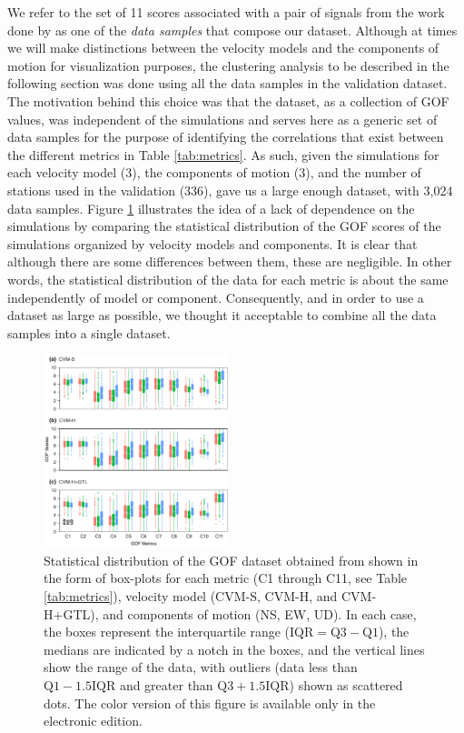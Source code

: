We refer to the set of 11 scores associated with a pair of signals from the work done by \citet{Taborda_2014_BSSA} as one of the \textit{data samples} that compose our dataset. Although at times we will make distinctions between the velocity models and the components of motion for visualization purposes, the clustering analysis to be described in the following section was done using all the data samples in the validation dataset. The motivation behind this choice was that the dataset, as a collection of GOF values, was independent of the simulations and serves here as a generic set of data samples for the purpose of identifying the correlations that exist between the different metrics in Table \ref{tab:metrics}. As such, given the simulations for each velocity model (3), the components of motion (3), and the number of stations used in the validation (336), gave us a large enough dataset, with 3,024 data samples. Figure \ref{fig:data-box-plot} illustrates the idea of a lack of dependence on the simulations by comparing the statistical distribution of the GOF scores of the simulations organized by velocity models and components. It is clear that although there are some differences between them, these are negligible. In other words, the statistical distribution of the data for each metric is about the same independently of model or component. Consequently, and in order to use a dataset as large as possible, we thought it acceptable to combine all the data samples into a single dataset.

\begin{figure}[ht!]
    \centering
    \includegraphics[width=0.48\textwidth]{figures/pdf/figure-03}
    \caption{Statistical distribution of the GOF dataset obtained from \citet{Taborda_2014_BSSA} shown in the form of box-plots for each metric (C1 through C11, see Table \ref{tab:metrics}), velocity model (CVM-S, CVM-H, and CVM-H+GTL), and components of motion (NS, EW, UD). In each case, the boxes represent the interquartile range ($\mathrm{IQR} = \mathrm{Q}3 - \mathrm{Q}1$), the medians are indicated by a notch in the boxes, and the vertical lines show the range of the data, with outliers (data less than $\mathrm{Q}1 - 1.5 \mathrm{IQR}$ and greater than $\mathrm{Q}3 + 1.5 \mathrm{IQR}$) shown as scattered dots. The color version of this figure is available only in the electronic edition.}
    \label{fig:data-box-plot}
\end{figure}
